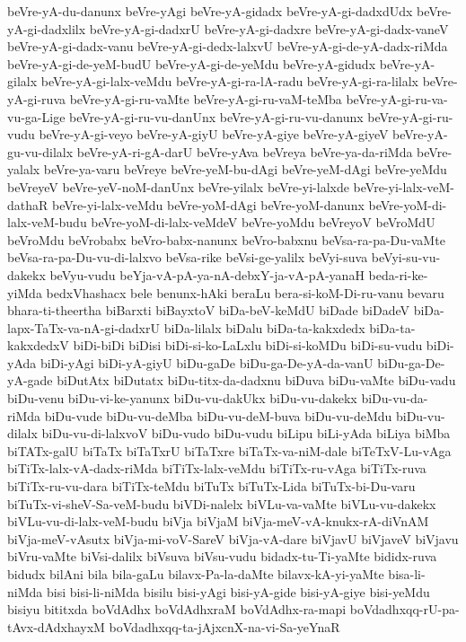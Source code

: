 {beVre-yA-du-danunx
beVre-yAgi
beVre-yA-gidadx
beVre-yA-gi-dadxdUdx
beVre-yA-gi-dadxlilx
beVre-yA-gi-dadxrU
beVre-yA-gi-dadxre
beVre-yA-gi-dadx-vaneV
beVre-yA-gi-dadx-vanu
beVre-yA-gi-dedx-lalxvU
beVre-yA-gi-de-yA-dadx-riMda
beVre-yA-gi-de-yeM-budU
beVre-yA-gi-de-yeMdu
beVre-yA-gidudx
beVre-yA-gilalx
beVre-yA-gi-lalx-veMdu
beVre-yA-gi-ra-lA-radu
beVre-yA-gi-ra-lilalx
beVre-yA-gi-ruva
beVre-yA-gi-ru-vaMte
beVre-yA-gi-ru-vaM-teMba
beVre-yA-gi-ru-va-vu-ga-Lige
beVre-yA-gi-ru-vu-danUnx
beVre-yA-gi-ru-vu-danunx
beVre-yA-gi-ru-vudu
beVre-yA-gi-veyo
beVre-yA-giyU
beVre-yA-giye
beVre-yA-giyeV
beVre-yA-gu-vu-dilalx
beVre-yA-ri-gA-darU
beVre-yAva
beVreya
beVre-ya-da-riMda
beVre-yalalx
beVre-ya-varu
beVreye
beVre-yeM-bu-dAgi
beVre-yeM-dAgi
beVre-yeMdu
beVreyeV
beVre-yeV-noM-danUnx
beVre-yilalx
beVre-yi-lalxde
beVre-yi-lalx-veM-dathaR
beVre-yi-lalx-veMdu
beVre-yoM-dAgi
beVre-yoM-danunx
beVre-yoM-di-lalx-veM-budu
beVre-yoM-di-lalx-veMdeV
beVre-yoMdu
beVreyoV
beVroMdU
beVroMdu
beVrobabx
beVro-babx-nanunx
beVro-babxnu
beVsa-ra-pa-Du-vaMte
beVsa-ra-pa-Du-vu-di-lalxvo
beVsa-rike
beVsi-ge-yalilx
beVyi-suva
beVyi-su-vu-dakekx
beVyu-vudu
beYja-vA-pA-ya-nA-debxY-ja-vA-pA-yanaH
beda-ri-ke-yiMda
bedxVhashacx
bele
benunx-hAki
beraLu
bera-si-koM-Di-ru-vanu
bevaru
bhara-ti-theertha
biBarxti
biBayxtoV
biDa-beV-keMdU
biDade
biDadeV
biDa-lapx-TaTx-va-nA-gi-dadxrU
biDa-lilalx
biDalu
biDa-ta-kakxdedx
biDa-ta-kakxdedxV
biDi-biDi
biDisi
biDi-si-ko-LaLxlu
biDi-si-koMDu
biDi-su-vudu
biDi-yAda
biDi-yAgi
biDi-yA-giyU
biDu-gaDe
biDu-ga-De-yA-da-vanU
biDu-ga-De-yA-gade
biDutAtx
biDutatx
biDu-titx-da-dadxnu
biDuva
biDu-vaMte
biDu-vadu
biDu-venu
biDu-vi-ke-yanunx
biDu-vu-dakUkx
biDu-vu-dakekx
biDu-vu-da-riMda
biDu-vude
biDu-vu-deMba
biDu-vu-deM-buva
biDu-vu-deMdu
biDu-vu-dilalx
biDu-vu-di-lalxvoV
biDu-vudo
biDu-vudu
biLipu
biLi-yAda
biLiya
biMba
biTATx-galU
biTaTx
biTaTxrU
biTaTxre
biTaTx-va-niM-dale
biTeTxV-Lu-vAga
biTiTx-lalx-vA-dadx-riMda
biTiTx-lalx-veMdu
biTiTx-ru-vAga
biTiTx-ruva
biTiTx-ru-vu-dara
biTiTx-teMdu
biTuTx
biTuTx-Lida
biTuTx-bi-Du-varu
biTuTx-vi-sheV-Sa-veM-budu
biVDi-nalelx
biVLu-va-vaMte
biVLu-vu-dakekx
biVLu-vu-di-lalx-veM-budu
biVja
biVjaM
biVja-meV-vA-knukx-rA-diVnAM
biVja-meV-vAsutx
biVja-mi-voV-SareV
biVja-vA-dare
biVjavU
biVjaveV
biVjavu
biVru-vaMte
biVsi-dalilx
biVsuva
biVsu-vudu
bidadx-tu-Ti-yaMte
bididx-ruva
bidudx
bilAni
bila
bila-gaLu
bilavx-Pa-la-daMte
bilavx-kA-yi-yaMte
bisa-li-niMda
bisi
bisi-li-niMda
bisilu
bisi-yAgi
bisi-yA-gide
bisi-yA-giye
bisi-yeMdu
bisiyu
bititxda
boVdAdhx
boVdAdhxraM
boVdAdhx-ra-mapi
boVdadhxqq-rU-pa-tAvx-dAdxhayxM
boVdadhxqq-ta-jAjxcnX-na-vi-Sa-yeYnaR
}
